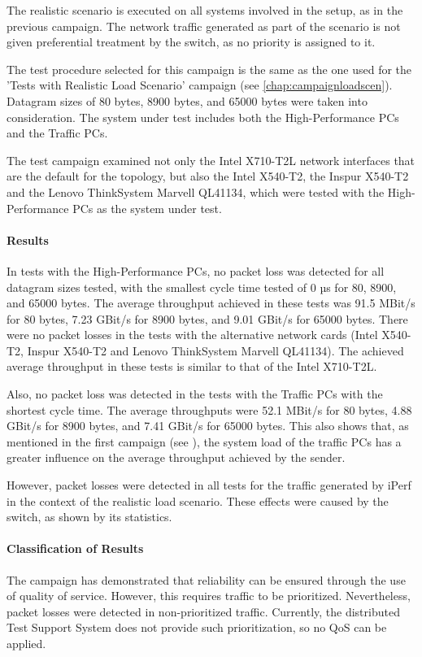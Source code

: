 The realistic scenario is executed on all systems involved in the setup, as in the previous campaign. The network traffic generated as part of the scenario is not given preferential treatment by the switch, as no priority is assigned to it.

The test procedure selected for this campaign is the same as the one used for the 'Tests with Realistic Load Scenario' campaign (see \ref{chap:campaignloadscen}). Datagram sizes of 80 bytes, 8900 bytes, and 65000 bytes were taken into consideration. The system under test includes both the High-Performance PCs and the Traffic PCs.

The test campaign examined not only the Intel X710-T2L network interfaces that are the default for the topology, but also the Intel X540-T2, the Inspur X540-T2 and the Lenovo ThinkSystem Marvell QL41134, which were tested with the High-Performance PCs as the system under test.

\paragraph{Results}
In tests with the High-Performance PCs, no packet loss was detected for all datagram sizes tested, with the smallest cycle time tested of 0 µs for 80, 8900, and 65000 bytes. The average throughput achieved in these tests was 91.5 MBit/s for 80 bytes, 7.23 GBit/s for 8900 bytes, and 9.01 GBit/s for 65000 bytes. There were no packet losses in the tests with the alternative network cards (Intel X540-T2, Inspur X540-T2 and Lenovo ThinkSystem Marvell QL41134). The achieved average throughput in these tests is similar to that of the Intel X710-T2L.

Also, no packet loss was detected in the tests with the Traffic PCs with the shortest cycle time. The average throughputs were 52.1 MBit/s for 80 bytes, 4.88 GBit/s for 8900 bytes, and 7.41 GBit/s for 65000 bytes. This also shows that, as mentioned in the first campaign (see \label{chap:relcamp1}), the system load of the traffic PCs has a greater influence on the average throughput achieved by the sender.

However, packet losses were detected in all tests for the traffic generated by iPerf in the context of the realistic load scenario. These effects were caused by the switch, as shown by its statistics.

\paragraph{Classification of Results}
The campaign has demonstrated that reliability can be ensured through the use of quality of service. However, this requires traffic to be prioritized. Nevertheless, packet losses were detected in non-prioritized traffic. Currently, the distributed Test Support System does not provide such prioritization, so no QoS can be applied.

